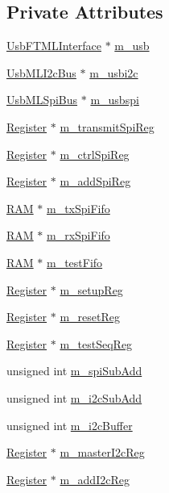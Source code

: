 \subsection*{Private Attributes}
\begin{DoxyCompactItemize}
\item 
\hyperlink{classUsbFTMLInterface}{UsbFTMLInterface} $\ast$ \hyperlink{classFePGA_afb7947e600a66d914ee524acec3d8b1f}{m\_\-usb}
\item 
\hyperlink{classUsbMLI2cBus}{UsbMLI2cBus} $\ast$ \hyperlink{classFePGA_a09fdde4002008daa0d15672772dd4483}{m\_\-usbi2c}
\item 
\hyperlink{classUsbMLSpiBus}{UsbMLSpiBus} $\ast$ \hyperlink{classFePGA_a922a56250b29c9842cdb8095cae8c976}{m\_\-usbspi}
\item 
\hyperlink{classRegister}{Register} $\ast$ \hyperlink{classFePGA_a003ee241fb5f32fb3442174db3fe6f49}{m\_\-transmitSpiReg}
\item 
\hyperlink{classRegister}{Register} $\ast$ \hyperlink{classFePGA_a8fb76733a688dff6d91892a49a97a21f}{m\_\-ctrlSpiReg}
\item 
\hyperlink{classRegister}{Register} $\ast$ \hyperlink{classFePGA_a569eb8410924bec1c8279ca80dc37a6a}{m\_\-addSpiReg}
\item 
\hyperlink{classRAM}{RAM} $\ast$ \hyperlink{classFePGA_a5b3e4deb73a882e6f044450d8a733558}{m\_\-txSpiFifo}
\item 
\hyperlink{classRAM}{RAM} $\ast$ \hyperlink{classFePGA_a3ee7f973bfad39b48bbc1a185e9ffaec}{m\_\-rxSpiFifo}
\item 
\hyperlink{classRAM}{RAM} $\ast$ \hyperlink{classFePGA_a97fc9347c90d9a31d99ccb499cc06eee}{m\_\-testFifo}
\item 
\hyperlink{classRegister}{Register} $\ast$ \hyperlink{classFePGA_a0255fe229013986b4387c3a75ddf4e97}{m\_\-setupReg}
\item 
\hyperlink{classRegister}{Register} $\ast$ \hyperlink{classFePGA_aeff1a2370237a06b50e1ae23d933c862}{m\_\-resetReg}
\item 
\hyperlink{classRegister}{Register} $\ast$ \hyperlink{classFePGA_a67bc3c8f923b673100974fd86096393e}{m\_\-testSeqReg}
\item 
unsigned int \hyperlink{classFePGA_a4f2f5d175aeb6dcaf497f81d2f075411}{m\_\-spiSubAdd}
\item 
unsigned int \hyperlink{classFePGA_aba8c2c8d8e0d136826b9dd4c2d7c2e90}{m\_\-i2cSubAdd}
\item 
unsigned int \hyperlink{classFePGA_a173664ffd6a73f454ae31f51e689dd16}{m\_\-i2cBuffer}
\item 
\hyperlink{classRegister}{Register} $\ast$ \hyperlink{classFePGA_adb390ea8de4a6cbce648dc62e4405f32}{m\_\-masterI2cReg}
\item 
\hyperlink{classRegister}{Register} $\ast$ \hyperlink{classFePGA_af3ef3467ba803e6d3b970ea8982d6246}{m\_\-addI2cReg}
\end{DoxyCompactItemize}


